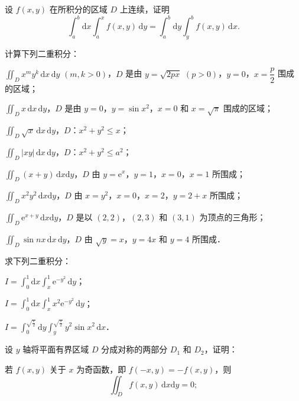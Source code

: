 \begin{xiti}
\begin{ziti}
\end{ziti}
\item 设 $f(x,y)$ 在所积分的区域 $D$ 上连续，证明
\[
\int_{a}^{b}\mathrm{d}x\int_{a}^{x}f(x,y)\,\mathrm{d}y=\int_{a}^{b}\mathrm{d}y\int_{y}^{b}f(x,y)\,\mathrm{d}x.
\]
\item 计算下列二重积分：
\begin{ziti}
\item $\displaystyle\iint_{D}x^{m}y^{k}\,\mathrm{d}x\,\mathrm{d}y$ $(m,k>0)$，$D$ 是由 $y=\sqrt{2px}$ $(p>0)$，$y=0$，$x=\dfrac{p}{2}$ 围成的区域；
\item $\displaystyle\iint_{D}x\,\mathrm{d}x\,\mathrm{d}y$，$D$ 是由 $y=0$，$y=\sin x^{2}$，$x=0$ 和 $x=\sqrt{\pi}$ 围成的区域；
\item $\displaystyle\iint_{D}\sqrt{x}\,\mathrm{d}x\,\mathrm{d}y$，$D$：$x^{2}+y^{2}\leqslant x$；
\item $\displaystyle\iint_{D}\left|xy\right|\,\mathrm{d}x\,\mathrm{d}y$，$D$：$x^{2}+y^{2}\leqslant a^{2}$；
\item $\displaystyle\iint_{D}(x+y)\,\mathrm{d}x\mathrm{d}y$，$D$ 由 $y=\mathrm{e}^{x}$，$y=1$，$x=0$，$x=1$ 所围成；
\item $\displaystyle\iint_{D}x^{2}y^{2}\,\mathrm{d}x\mathrm{d}y$，$D$ 由 $x=y^{2}$，$x=0$，$x=2$，$y=2+x$ 所围成；
\item $\displaystyle\iint_{D}\mathrm{e}^{x+y}\,\mathrm{d}x\mathrm{d}y$，$D$ 是以 $(2,2)$，$(2,3)$ 和 $(3,1)$ 为顶点的三角形；
\item $\displaystyle\iint_{D}\sin nx\,\mathrm{d}x\,\mathrm{d}y$，$D$ 由 $\sqrt{y}=x$，$y=4x$ 和 $y=4$ 所围成．
\end{ziti}
\item 求下列二重积分：
\begin{ziti}
\item $\displaystyle I=\int_{0}^{1}\mathrm{d}x\int_{x}^{1}\mathrm{e}^{-y^{2}}\,\mathrm{d}y$；
\item $\displaystyle I=\int_{0}^{1}\mathrm{d}x\int_{x}^{1}x^{2}\mathrm{e}^{-y^{2}}\,\mathrm{d}y$；
\item $\displaystyle I=\int_{0}^{\sqrt{\frac{\pi}{2}}}\mathrm{d}y\int_{y}^{\sqrt{\frac{\pi}{2}}}y^{2}\sin x^{2}\,\mathrm{d}x$．
\end{ziti}
\item 设 $y$ 轴将平面有界区域 $D$ 分成对称的两部分 $D_{1}$ 和 $D_{2}$，证明：
\begin{ziti}
\item 若 $f(x,y)$ 关于 $x$ 为奇函数，即 $f(-x,y)=-f(x,y)$，则
\[
\iint_{D}f(x,y)\,\mathrm{d}x\mathrm{d}y=0;
\]
\end{ziti}
\end{xiti}
